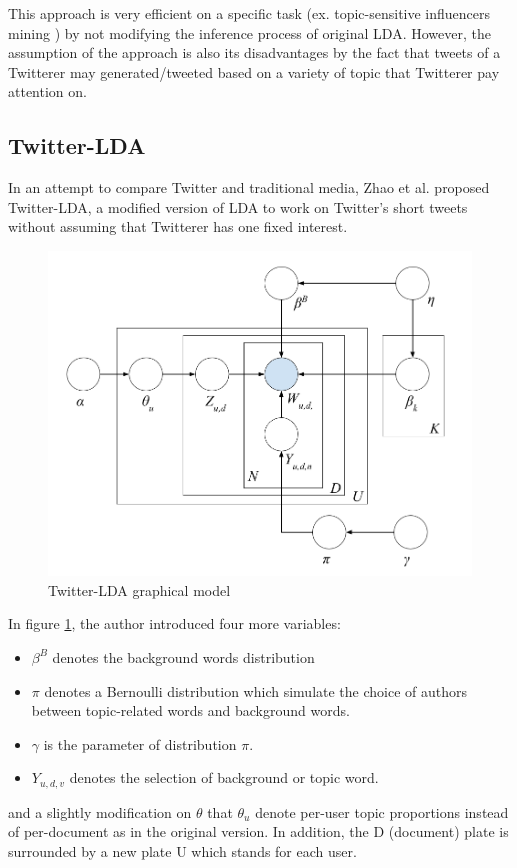 \documentclass[conference,compsoc]{IEEEtran}
\begin{document}
This approach is very efficient on a specific task (ex. topic-sensitive influencers mining \cite{Weng2010}) by not modifying the inference process of original LDA. However, the assumption of the approach is also its disadvantages by the fact that tweets of a Twitterer may generated/tweeted based on a variety of topic that Twitterer pay attention on.

\subsection{Twitter-LDA}

In an attempt to compare Twitter and traditional media, Zhao et al. \cite{zhao2011comparing} proposed Twitter-LDA, a modified version of LDA to work on Twitter's short tweets without assuming that Twitterer has one fixed interest.

\begin{figure}[h]
	\centering
	\includegraphics[scale=0.27]{twitter_lda_model}
	\caption{Twitter-LDA graphical model}
	\label{fig:twitter_lda_model}
\end{figure}

In figure \ref{fig:twitter_lda_model}, the author introduced four more variables:
\begin{itemize}
	\item $\beta^B$ denotes the background words distribution
	\item $\pi$ denotes a Bernoulli distribution which simulate the choice of authors between topic-related words and background words.
	\item $\gamma$ is the parameter of distribution $\pi$.
	\item $Y_{u,d,v}$ denotes the selection of background or topic word.
\end{itemize} 
and a slightly modification on $\theta$ that $\theta_u$ denote per-user topic proportions instead of per-document as in the original version. In addition, the D (document) plate is surrounded by a new plate U which stands for each user.
\end{document}

